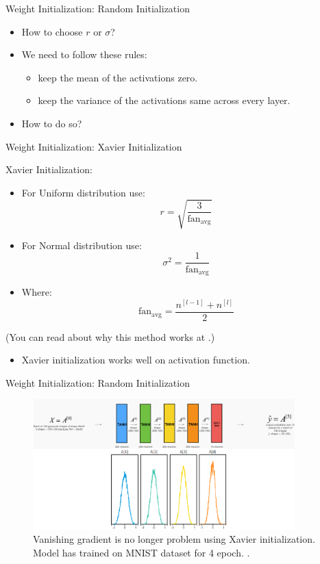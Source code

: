 \begin{frame}{Weight Initialization: Random Initialization}
	\begin{itemize}
		\item How to choose $r$ or $\sigma$?
		\item We need to follow these rules:
		\begin{itemize}
			\item keep the mean of the activations zero.
			\item keep the variance of the activations same across every layer.
		\end{itemize}
		\item How to do so?
	\end{itemize}
\end{frame}

\begin{frame}{Weight Initialization: Xavier Initialization}
	\begin{block}{Xavier Initialization:}
		\begin{itemize}
			\item For Uniform distribution use:
			\[
			r = \sqrt{\frac{3}{\text{fan}_\text{avg}}}
			\]
			
			\medskip
			\item For Normal distribution use:
			\[
				\sigma^2 = \frac{1}{\text{fan}_\text{avg}}
			\]
			\item Where:
			\[
			\text{fan}_\text{avg} = \frac{n^{[l-1]} + n^{[l]}}{2}
			\]
		\end{itemize}
		{\scriptsize (You can read about why this method works at \cite{katanforoosh-kunin}.)}
	\end{block}
	\begin{itemize}
		\medskip
		\medskip
		\item Xavier initialization works well on  activation function.
	\end{itemize}
\end{frame}


\begin{frame}{Weight Initialization: Random Initialization}
	\begin{figure}[H]
		\centering
		\includegraphics[width=0.9\textwidth]{Images/xavier-init.png}
		\caption{Vanishing gradient is no longer problem using Xavier initialization. Model has trained on MNIST dataset for 4 epoch. \cite{katanforoosh-kunin}.}
	\end{figure}
\end{frame}

